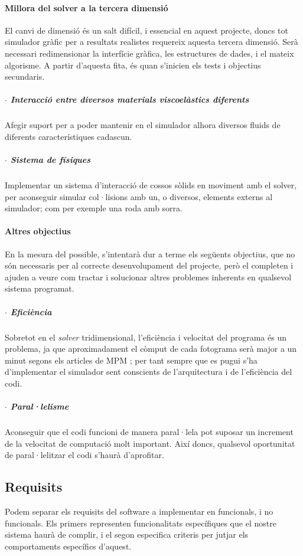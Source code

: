 \documentclass[a4paper]{report}
\begin{document}
	\paragraph{Millora del solver a la tercera dimensió} El canvi de dimensió és un salt difícil, i essencial en aquest projecte, doncs tot simulador gràfic per a resultats realistes requereix aquesta tercera dimensió. Serà necessari redimensionar la interfície gràfica, les estructures de dades, i el mateix algorisme.
	\newline
	A partir d'aquesta fita, és quan s'inicien els tests i objectius secundaris.
	\subparagraph[Interacció viscoelàstica]{$\cdot$ Interacció entre diversos materials viscoelàstics diferents} Afegir suport per a poder mantenir en el simulador alhora diversos fluids de diferents característiques cadascun.
	\subparagraph[Sistema de físiques]{$\cdot$ Sistema de físiques} Implementar un sistema d'interacció de cossos sòlids en moviment amb el solver, per aconseguir simular col·lisions amb un, o diversos, elements externs al simulador; com per exemple una roda amb sorra.
	
	\paragraph{Altres objectius} En la mesura del possible, s'intentarà dur a terme els següents objectius, que no són necessaris per al correcte desenvolupament del projecte, però el completen i ajuden a veure com tractar i solucionar altres problemes inherents en qualsevol sistema programat.
	\subparagraph[Eficiència]{$\cdot$ Eficiència} Sobretot en el \textit{solver} tridimensional, l'eficiència i velocitat del programa és un problema, ja que aproximadament el còmput de cada fotograma serà major a un minut segons els articles de MPM \cite{hu2018mlsmpmcpic}; per tant sempre que es pugui s'ha d'implementar el simulador sent conscients de l'arquitectura i de l'eficiència del codi.
	\subparagraph[Paral·lelisme]{$\cdot$ Paral·lelisme} Aconseguir que el codi funcioni de manera paral·lela pot suposar un increment de la velocitat de computació molt important. Així doncs, qualsevol oportunitat de paral·lelitzar el codi s'haurà d'aprofitar.
	
	
	\subsection{Requisits}
	Podem separar els requisits del software a implementar en funcionals, i no funcionals. Els primers representen funcionalitats específiques que el nostre sistema haurà de complir, i el segon especifica criteris per jutjar els comportaments específics d'aquest.
	
\end{document}
